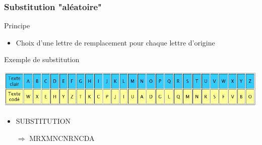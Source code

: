 \documentclass[xcolor={dvipsnames}]{beamer}
\begin{document}
\begin{frame}
	\frametitle{Substitution "aléatoire"}
	
	\begin{block}{Principe}
		\begin{itemize}
			\item Choix d'une lettre de remplacement pour chaque lettre d'origine
		\end{itemize}
	\end{block}
	
	\begin{exampleblock}{Exemple de substitution}
		
		\begin{center}
			\includegraphics[scale=0.62]{subst}\pause
		\end{center}
		\begin{itemize}
			\item SUBSTITUTION\pause
			\item[$\Rightarrow$] MRXMNCNRNCDA
		\end{itemize}
		
		
	\end{exampleblock}
	
	
\end{frame}
\end{document}
